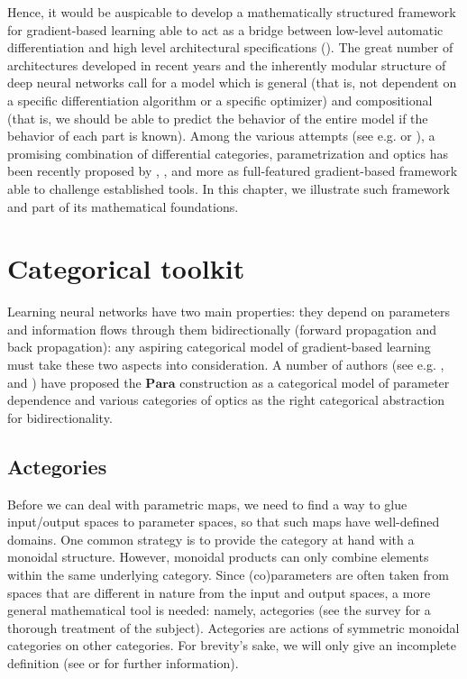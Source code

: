 \documentclass[11pt,a4paper,openright,twoside]{report}
\theoremstyle{plain}
\theoremstyle{definition}
\begin{document}
Hence, it would be auspicable to develop a mathematically structured framework for gradient-based learning able to act as a bridge between low-level automatic differentiation and high level architectural specifications (\cite{gavranovic2024fundamental}). The great number of architectures developed in recent years and the inherently modular structure of deep neural networks call for a model which is general (that is, not dependent on a specific differentiation algorithm or a specific optimizer) and compositional (that is, we should be able to predict the behavior of the entire model if the behavior of each part is known). Among the various attempts (see e.g. \cite{fong2019backprop} or \cite{sennesh2023computing}), a promising combination of differential categories, parametrization and optics has been recently proposed by \cite{cockett2019reverse}, \cite{cruttwell2022categorical}, \cite{gavranovic2024fundamental} and more as full-featured gradient-based framework able to challenge established tools. In this chapter, we illustrate such framework  and part of its mathematical foundations. 



\section{Categorical toolkit}

Learning neural networks have two main properties: they depend on parameters and information flows through them bidirectionally (forward propagation and back propagation): any aspiring categorical model of gradient-based learning must take these two aspects into consideration. A number of authors (see e.g. \cite{gavranovic2024fundamental}, and \cite{cruttwell2022categorical}) have proposed the $\mathbf{Para}$ construction as a categorical model of parameter dependence and various categories of optics as the right categorical abstraction for bidirectionality.

\subsection{Actegories}

Before we can deal with parametric maps, we need to find a way to glue input/output spaces to parameter spaces, so that such maps have well-defined domains. One common strategy is to provide the category at hand with a monoidal structure. However, monoidal products can only combine elements within the same underlying category. Since (co)parameters are often taken from spaces that are different in nature from the input and output spaces, a more general mathematical tool is needed: namely, actegories (see the survey \cite{capucci2022actegories} for a thorough treatment of the subject).  Actegories are actions of symmetric monoidal categories on other categories. For brevity's sake, we will only give an incomplete definition (see \cite{capucci2022actegories} or \cite{gavranovic2024fundamental} for further information).
\end{document}
